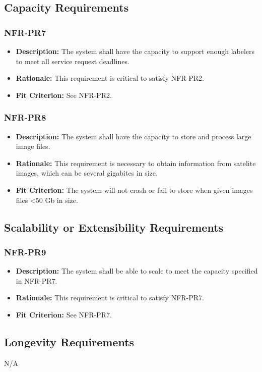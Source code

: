 \documentclass[12pt]{article}
\begin{document}
\subsection{Capacity Requirements}
\subsubsection*{NFR-PR7}
\begin{itemize}
  \item \textbf{Description:} The system shall have the capacity to support enough labelers to meet all service request deadlines.
  \item \textbf{Rationale:} This requirement is critical to satisfy NFR-PR2.
  \item \textbf{Fit Criterion:} See NFR-PR2.
\end{itemize}
\subsubsection*{NFR-PR8}
\begin{itemize}
  \item \textbf{Description:} The system shall have the capacity to store and process large image files.
  \item \textbf{Rationale:} This requirement is necessary to obtain information from satelite images, which can be several gigabites in size.
  \item \textbf{Fit Criterion:} The system will not crash or fail to store when given images files <50 Gb in size.
\end{itemize}
\subsection{Scalability or Extensibility Requirements}
\subsubsection*{NFR-PR9}
\begin{itemize}
  \item \textbf{Description:} The system shall be able to scale to meet the capacity specified in NFR-PR7.
  \item \textbf{Rationale:} This requirement is critical to satisfy NFR-PR7.
  \item \textbf{Fit Criterion:} See NFR-PR7.
\end{itemize}
\subsection{Longevity Requirements}
N/A
\end{document}
